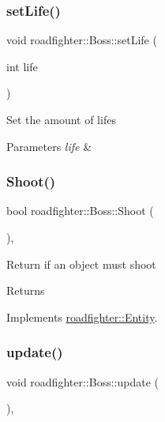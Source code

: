 \subsubsection{\texorpdfstring{set\+Life()}{setLife()}}
{\footnotesize\ttfamily void roadfighter\+::\+Boss\+::set\+Life (\begin{DoxyParamCaption}\item[{int}]{life }\end{DoxyParamCaption})}

Set the amount of lifes 
\begin{DoxyParams}{Parameters}
{\em life} & \\
\hline
\end{DoxyParams}
\mbox{\label{classroadfighter_1_1Boss_a794027599b17398ae72c65aa1837d864}} 
\subsubsection{\texorpdfstring{Shoot()}{Shoot()}}
{\footnotesize\ttfamily bool roadfighter\+::\+Boss\+::\+Shoot (\begin{DoxyParamCaption}{ }\end{DoxyParamCaption})\hspace{0.3cm}{\ttfamily [override]}, {\ttfamily [virtual]}}

Return if an object must shoot \begin{DoxyReturn}{Returns}

\end{DoxyReturn}


Implements \hyperlink{classroadfighter_1_1Entity_ad0ecaa0539db252e591da83814251509}{roadfighter\+::\+Entity}.

\mbox{\label{classroadfighter_1_1Boss_aa097f1f2e3fe76645233a4ba75ee6256}} 
\subsubsection{\texorpdfstring{update()}{update()}\hspace{0.1cm}{\footnotesize\ttfamily [1/2]}}
{\footnotesize\ttfamily void roadfighter\+::\+Boss\+::update (\begin{DoxyParamCaption}{ }\end{DoxyParamCaption})\hspace{0.3cm}{\ttfamily [override]}, {\ttfamily [virtual]}}

